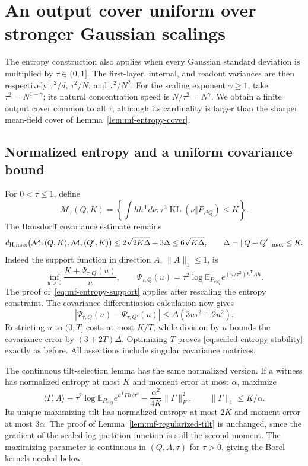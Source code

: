 \section{An output cover uniform over stronger Gaussian scalings}
\label{sec:scaled-entropy-cover}

The entropy construction also applies when every Gaussian standard
deviation is multiplied by $\tau\in(0,1]$.  The first-layer, internal,
and readout variances are then respectively
$\tau^2/d$, $\tau^2/N$, and $\tau^2/N^2$.
For the scaling exponent $\gamma\geq1$, take
$\tau^2=N^{1-\gamma}$; its natural concentration speed is
$N/\tau^2=N^\gamma$.  We obtain a finite output cover common to all
$\tau$, although its cardinality is larger than the sharper
mean-field cover of Lemma~\ref{lem:mf-entropy-cover}.

\subsection{Normalized entropy and a uniform covariance bound}

For $0<\tau\leq1$, define
\[
 \mathcal M_\tau(Q,K)=
 \left\{\int hh^{\mathsf T}d\nu:
       \tau^2\operatorname{KL}(\nu\Vert P_{\tau^2Q})\leq K\right\}.
\]
The Hausdorff covariance estimate remains
\begin{equation}
 d_{\rm H,max}\bigl(\mathcal M_\tau(Q,K),
                   \mathcal M_\tau(Q',K)\bigr)
 \leq2\sqrt{2K\Delta}+3\Delta\leq6\sqrt{K\Delta},
 \qquad \Delta=\|Q-Q'\|_{\max}\leq K.
 \label{eq:scaled-entropy-stability}
\end{equation}
Indeed the support function in direction $A$, $\|A\|_1\leq1$, is
\[
 \inf_{u>0}\frac{K+\Psi_{\tau,Q}(u)}u,
 \qquad
 \Psi_{\tau,Q}(u)=\tau^2\log
   \mathbb E_{P_{\tau^2Q}}
            e^{(u/\tau^2)h^{\mathsf T}Ah}.
\]
The proof of~\eqref{eq:mf-entropy-support} applies after rescaling
the entropy constraint.  The covariance differentiation calculation
now gives
\[
 |\Psi_{\tau,Q}(u)-\Psi_{\tau,Q'}(u)|
       \leq\Delta(3u\tau^2+2u^2).
\]
Restricting $u$ to $(0,T]$ costs at most $K/T$, while division by $u$
bounds the covariance error by $(3+2T)\Delta$.  Optimizing $T$ proves
\eqref{eq:scaled-entropy-stability} exactly as before.  All assertions
include singular covariance matrices.

The continuous tilt-selection lemma has the same normalized version.
If a witness has normalized entropy at most $K$ and moment error at
most $\alpha$, maximize
\begin{equation}
 \langle\Gamma,A\rangle
 -\tau^2\log\mathbb E_{P_{\tau^2Q}}
                  e^{h^{\mathsf T}\Gamma h/\tau^2}
 -\frac{\alpha^2}{4K}\|\Gamma\|_F^2,
 \qquad \|\Gamma\|_1\leq K/\alpha.
 \label{eq:scaled-regularized-dual}
\end{equation}
Its unique maximizing tilt has normalized entropy at most $2K$ and
moment error at most $3\alpha$.  The proof of
Lemma~\ref{lem:mf-regularized-tilt} is unchanged, since the gradient
of the scaled log partition function is still the second moment.
The maximizing parameter is continuous in $(Q,A,\tau)$ for
$\tau>0$, giving the Borel kernels needed below.

